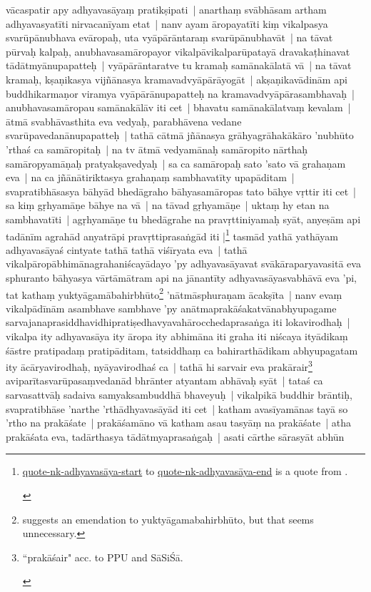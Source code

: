 \documentclass[article,12pt,a4paper]{memoir}
\newcommand{\persName}[1]{#1}
\begin{document}
	  \pstart \persName{vācaspatir} apy adhyavasāyaṃ pratikṣipati | \label{quote-nk-adhyavasāya-start} anarthaṃ svābhāsam artham adhyavasyatīti nirvacanīyam etat | nanv ayam āropayatīti kiṃ vikalpasya svarūpānubhava evāropaḥ, uta vyāpārāntaraṃ svarūpānubhavāt | na tāvat pūrvaḥ kalpaḥ, anubhavasamāropayor vikalpāvikalparūpatayā dravakaṭhinavat tādātmyānupapatteḥ | vyāpārāntaratve tu kramaḥ samānakālatā vā | na tāvat kramaḥ, kṣaṇikasya vijñānasya kramavadvyāpārāyogāt | akṣaṇikavādinām api buddhikarmaṇor viramya vyāpārānupapatteḥ na kramavadvyāpārasambhavaḥ | anubhavasamāropau samānakālāv iti cet | bhavatu samānakālatvaṃ kevalam | ātmā svabhāvasthita eva vedyaḥ, parabhāvena vedane svarūpavedanānupapatteḥ | tathā cātmā jñānasya grāhyagrāhakākāro 'nubhūto 'rthaś ca samāropitaḥ | na tv ātmā vedyamānaḥ samāropito nārthaḥ samāropyamāṇaḥ pratyakṣavedyaḥ | sa ca samāropaḥ sato 'sato vā grahaṇam eva | na ca jñānātiriktasya grahaṇaṃ sambhavatīty upapāditam |\label{thakur75-135.27} svapratibhāsasya bāhyād bhedāgraho bāhyasamāropas tato bāhye vṛttir iti cet | sa kiṃ gṛhyamāṇe bāhye na vā | na tāvad gṛhyamāṇe | uktaṃ hy etan na  sambhavatīti | agṛhyamāṇe tu bhedāgrahe na pravṛttiniyamaḥ syāt, anyeṣām api tadānīm agrahād anyatrāpi pravṛttiprasaṅgād iti \label{quote-nk-adhyavasāya-end}|\footnote{\begin{english}\href{quote-nk-adhyavasāya-start}{quote-nk-adhyavasāya-start} to \href{quote-nk-adhyavasāya-end}{quote-nk-adhyavasāya-end} is a quote from \cite{NK1}.\end{english}} tasmād yathā yathāyam adhyavasāyaś cintyate tathā tathā viśīryata eva | tathā vikalpāropābhimānagrahaniścayādayo 'py adhyavasāyavat svākāraparyavasitā eva sphuranto bāhyasya vārtāmātram api na jānantīty adhyavasāyasvabhāvā eva  'pi, tat kathaṃ yuktyāgamābahirbhūto\footnote{\cite{thakur75} suggests an emendation to yuktyāgamabahirbhūto, but that seems unnecessary.} 'nātmāsphuraṇam ācakṣīta | \label{thakur75-136.3} nanv evaṃ vikalpādīnām asambhave sambhave 'py anātmaprakāśakatvānabhyupagame sarvajanaprasiddhavidhipratiṣedhavyavahārocchedaprasaṅga iti lokavirodhaḥ | vikalpa ity adhyavasāya ity āropa ity abhimāna iti graha iti niścaya ityādikaṃ śāstre pratipadaṃ pratipāditam, tatsiddhaṃ ca bahirarthādikam abhyupagatam ity ācāryavirodhaḥ, nyāyavirodhaś ca | tathā hi sarvair eva prakārair\footnote{\begin{english}``prakāśair" acc. to PPU and SāSiŚā.\end{english}} aviparītasvarūpasaṃvedanād bhrānter atyantam abhāvaḥ syāt | tataś ca sarvasattvāḥ sadaiva samyaksambuddhā bhaveyuḥ | \label{thakur75-136.9} vikalpikā buddhir brāntiḥ, svapratibhāse 'narthe 'rthādhyavasāyād iti cet | katham avasīyamānas tayā so 'rtho na prakāśate | prakāśamāno vā katham asau tasyāṃ na prakāśate | atha prakāśata eva, tadārthasya tādātmyaprasaṅgaḥ | asati cārthe sārasyāt abhūn 
\end{document}
